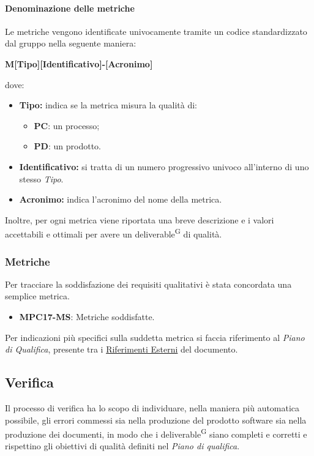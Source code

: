 \paragraph{Denominazione delle metriche}
Le metriche vengono identificate univocamente tramite un codice standardizzato dal gruppo nella seguente maniera:
\begin{center}
    \textbf{M[Tipo][Identificativo]-[Acronimo]}
\end{center}
dove:
\begin{itemize}
    \item \textbf{Tipo:} indica se la metrica misura la qualità di:
        \begin{itemize}
            \item \textbf{PC}: un processo;
            \item \textbf{PD}: un prodotto.
        \end{itemize}                 
    \item \textbf{Identificativo:} si tratta di un numero progressivo univoco all'interno di uno stesso \textit{Tipo}.
    \item \textbf{Acronimo:} indica l'acronimo del nome della metrica.
\end{itemize}
Inoltre, per ogni metrica viene riportata una breve descrizione e i valori accettabili e ottimali per avere un deliverable\textsuperscript{G} di qualità.

\subsubsection{Metriche}\label{sec:processi_di_supporto:accertamento_qualità:metriche}
Per tracciare la soddisfazione dei requisiti qualitativi è stata concordata una semplice metrica.
\begin{itemize}
    \item \textbf{MPC17-MS}: Metriche soddisfatte.
\end{itemize}
Per indicazioni più specifici sulla suddetta metrica si faccia riferimento al \textit{Piano di Qualifica}, presente tra i \hyperref[sec:riferimenti_esterni]{Riferimenti Esterni} del documento.


\subsection{Verifica}\label{sec:processi_di_supporto:verifica}
Il processo di verifica ha lo scopo di individuare, nella maniera più automatica possibile, gli errori commessi sia nella produzione del prodotto software sia nella produzione dei documenti, in modo che i deliverable\textsuperscript{G} siano completi e corretti e rispettino gli obiettivi di qualità definiti nel \textit{Piano di qualifica}.

